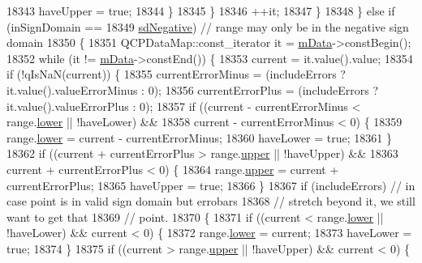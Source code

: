 \begin{DoxyCode}
18343           haveUpper = \textcolor{keyword}{true};
18344         \}
18345       \}
18346       ++it;
18347     \}
18348   \} \textcolor{keywordflow}{else} \textcolor{keywordflow}{if} (inSignDomain ==
18349              \hyperlink{class_q_c_p_abstract_plottable_a661743478a1d3c09d28ec2711d7653d8a0fc9a70796ef60ad18ddd18056e6dc63}{sdNegative}) \textcolor{comment}{// range may only be in the negative sign domain}
18350   \{
18351     QCPDataMap::const\_iterator it = \hyperlink{class_q_c_p_graph_a8457c840f69a0ac49f61d30a509c5d08}{mData}->constBegin();
18352     \textcolor{keywordflow}{while} (it != \hyperlink{class_q_c_p_graph_a8457c840f69a0ac49f61d30a509c5d08}{mData}->constEnd()) \{
18353       current = it.value().value;
18354       \textcolor{keywordflow}{if} (!qIsNaN(current)) \{
18355         currentErrorMinus = (includeErrors ? it.value().valueErrorMinus : 0);
18356         currentErrorPlus = (includeErrors ? it.value().valueErrorPlus : 0);
18357         \textcolor{keywordflow}{if} ((current - currentErrorMinus < range.\hyperlink{class_q_c_p_range_aa3aca3edb14f7ca0c85d912647b91745}{lower} || !haveLower) &&
18358             current - currentErrorMinus < 0) \{
18359           range.\hyperlink{class_q_c_p_range_aa3aca3edb14f7ca0c85d912647b91745}{lower} = current - currentErrorMinus;
18360           haveLower = \textcolor{keyword}{true};
18361         \}
18362         \textcolor{keywordflow}{if} ((current + currentErrorPlus > range.\hyperlink{class_q_c_p_range_ae44eb3aafe1d0e2ed34b499b6d2e074f}{upper} || !haveUpper) &&
18363             current + currentErrorPlus < 0) \{
18364           range.\hyperlink{class_q_c_p_range_ae44eb3aafe1d0e2ed34b499b6d2e074f}{upper} = current + currentErrorPlus;
18365           haveUpper = \textcolor{keyword}{true};
18366         \}
18367         \textcolor{keywordflow}{if} (includeErrors) \textcolor{comment}{// in case point is in valid sign domain but errobars}
18368                            \textcolor{comment}{// stretch beyond it, we still want to get that}
18369                            \textcolor{comment}{// point.}
18370         \{
18371           \textcolor{keywordflow}{if} ((current < range.\hyperlink{class_q_c_p_range_aa3aca3edb14f7ca0c85d912647b91745}{lower} || !haveLower) && current < 0) \{
18372             range.\hyperlink{class_q_c_p_range_aa3aca3edb14f7ca0c85d912647b91745}{lower} = current;
18373             haveLower = \textcolor{keyword}{true};
18374           \}
18375           \textcolor{keywordflow}{if} ((current > range.\hyperlink{class_q_c_p_range_ae44eb3aafe1d0e2ed34b499b6d2e074f}{upper} || !haveUpper) && current < 0) \{

\end{DoxyCode}
